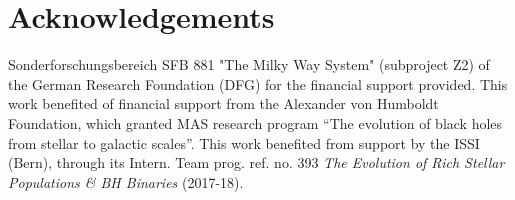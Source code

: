 \documentclass[twocolumn]{aastex62}
\begin{document}
\section*{Acknowledgements}

Sonderforschungsbereich SFB 881 "The Milky Way System" (subproject Z2) of the German Research Foundation (DFG) for the financial support provided. This work benefited of financial support from the Alexander von Humboldt Foundation, which granted MAS research program ``The evolution of black holes from stellar to galactic scales''. 
This work benefited from support by the ISSI (Bern), through its Intern. Team prog. ref. no. 393 {\it The Evolution of Rich Stellar Populations \& BH Binaries} (2017-18).


\footnotesize{


}
\end{document}
